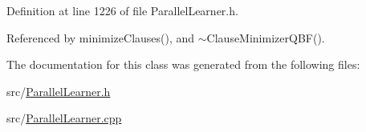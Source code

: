 Definition at line 1226 of file Parallel\-Learner.\-h.



Referenced by minimize\-Clauses(), and $\sim$\-Clause\-Minimizer\-Q\-B\-F().



The documentation for this class was generated from the following files\-:\begin{DoxyCompactItemize}
\item 
src/\hyperlink{ParallelLearner_8h}{Parallel\-Learner.\-h}\item 
src/\hyperlink{ParallelLearner_8cpp}{Parallel\-Learner.\-cpp}\end{DoxyCompactItemize}
